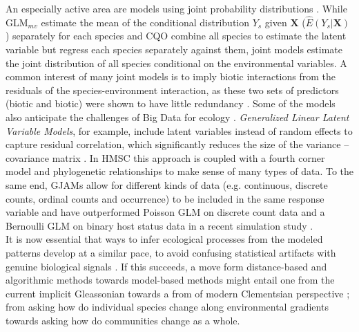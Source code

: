 	An especially active area are models using joint probability distributions \citep[e.g.][]{Clark2014, Pollock2014}. 
	While GLM$_{mv}$ estimate the mean of the conditional distribution $Y_s$   given  $\mathbf{X}$ ($\hat{E}(Y_s|\mathbf{X})$) separately for each species and CQO combine all species to estimate the latent variable but regress each species separately against them,
	joint models estimate the joint distribution of all species conditional on the environmental variables.  
	A common interest of many joint models is to imply biotic interactions from the residuals of the species-environment interaction, 
	as these two sets of predictors (biotic and biotic) were shown to have little redundancy \citep{Meier2010}.
	Some of the models also anticipate the challenges of Big Data for ecology \citep{Hampton2013}.
	\textit{Generalized Linear Latent Variable Models}, for example, include latent variables instead of random effects to capture residual correlation, which significantly reduces the size of the variance -- covariance matrix \citep{Warton2015,Niku2017}.  
	In HMSC \citep{Ovaskainen2017} this approach is coupled with a fourth corner model \cite[including species traits, ][]{legendre1997relating} and phylogenetic relationships to make sense of many types of data.
	To the same end, GJAMs allow for different kinds of data (e.g. continuous, discrete counts, ordinal counts and occurrence) to be included in the same response variable and have outperformed Poisson GLM on discrete count data and a Bernoulli GLM on binary host status data in a recent simulation study \citep{Clark2017}. \\
	
	
	It is now essential that ways to infer ecological processes from the modeled patterns develop at a similar pace, to avoid confusing statistical artifacts with genuine biological signals \citep{dormann2018biotic}.
	If this succeeds, a move form distance-based and algorithmic methods towards model-based methods might entail one from the current implicit Gleassonian towards a from of modern Clementsian perspective \citep{Eliot2011}; from asking how do individual species change along environmental gradients towards asking how do communities change as a whole.   



 





